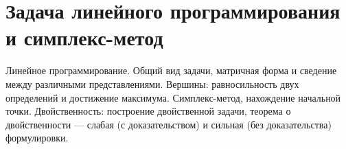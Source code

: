 \section{Задача линейного программирования и симплекс-метод}
Линейное программирование.
Общий вид задачи, матричная форма и
сведение между различными представлениями.
Вершины: равносильность двух определений и достижение максимума.
Симплекс-метод, нахождение начальной точки.
Двойственность: построение двойственной
задачи, теорема о двойственности --- слабая (с доказательством)
и сильная (без доказательства) формулировки.
